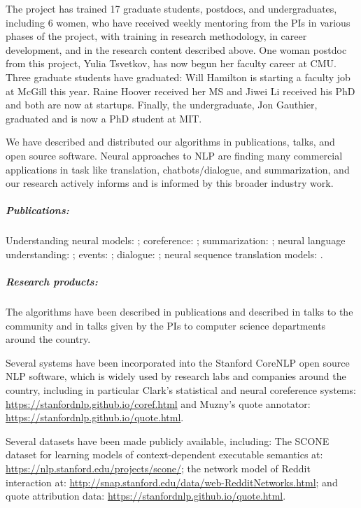 \documentclass{article}
\begin{document}
The project has trained 17 graduate students, postdocs, and undergraduates, including 6 women, who have received weekly mentoring from the PIs in various phases of the project, with training in research methodology, in career development, and in the research content described above. One woman postdoc from this project, Yulia Tsvetkov, has now begun her faculty career at CMU. Three graduate students have graduated: Will Hamilton is starting a faculty job at McGill this year. Raine Hoover received her MS and Jiwei Li received his PhD and both are now at startups. Finally, the undergraduate, Jon Gauthier, graduated and is now a PhD student at MIT.

We have described and distributed our algorithms in publications, talks, and open source software. Neural approaches to NLP are finding many commercial applications in task like translation, chatbots/dialogue, and summarization, and our research actively informs and is informed by this broader industry work.



\subparagraph{Publications:} Understanding neural models: \cite{li2015tree,khandelwal2018lm}; coreference: \cite{clark2016deep,clark2016improving}; summarization: \cite{see2016compression}; neural language understanding: \cite{bowman2016spinn,hamilton2016cultural,hamilton2016diachronic}; events: \cite{huang2016events}; dialogue: \cite{li2017adversarial,muzny2017twostage,guu2017bridging}; neural sequence translation models: \cite{luong2016acl_hybrid,wuebker2016acl}.


\subparagraph{Research products:}

The algorithms have been described in publications and described in talks to the community and in talks given by the PIs to computer science departments around the country.

 Several systems have been incorporated into the Stanford CoreNLP open source NLP software, which is widely used by research labs and companies around the country, including in particular Clark's statistical and neural coreference systems: \url{https://stanfordnlp.github.io/coref.html} and Muzny's quote annotator: \url{https://stanfordnlp.github.io/quote.html}.

Several datasets have been made publicly available, including: The SCONE dataset for learning models of context-dependent executable semantics at: \url{https://nlp.stanford.edu/projects/scone/}; the network model of Reddit interaction at: \url{http://snap.stanford.edu/data/web-RedditNetworks.html}; and quote attribution data: \url{https://stanfordnlp.github.io/quote.html}.




\end{document}
